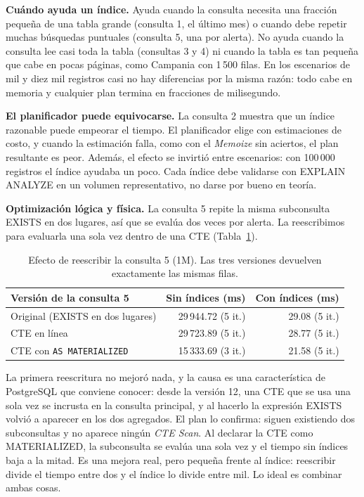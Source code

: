 \documentclass[11pt,letterpaper]{article}
\newcommand{\tbus}{\textunderscore\allowbreak}
\newcommand{\tb}[1]{{\ttfamily\let\_\tbus #1}}
\begin{document}
\textbf{Cuándo ayuda un índice.} Ayuda cuando la consulta necesita una fracción pequeña de una tabla grande (consulta 1, el último mes) o cuando debe repetir muchas búsquedas puntuales (consulta 5, una por alerta). No ayuda cuando la consulta lee casi toda la tabla (consultas 3 y 4) ni cuando la tabla es tan pequeña que cabe en pocas páginas, como \tb{Campania} con 1\,500 filas. En los escenarios de mil y diez mil registros casi no hay diferencias por la misma razón: todo cabe en memoria y cualquier plan termina en fracciones de milisegundo.

\textbf{El planificador puede equivocarse.} La consulta 2 muestra que un índice razonable puede empeorar el tiempo. El planificador elige con estimaciones de costo, y cuando la estimación falla, como con el \emph{Memoize} sin aciertos, el plan resultante es peor. Además, el efecto se invirtió entre escenarios: con 100\,000 registros el índice ayudaba un poco. Cada índice debe validarse con \tb{EXPLAIN ANALYZE} en un volumen representativo, no darse por bueno en teoría.

\textbf{Optimización lógica y física.} La consulta 5 repite la misma subconsulta \tb{EXISTS} en dos lugares, así que se evalúa dos veces por alerta. La reescribimos para evaluarla una sola vez dentro de una CTE (Tabla~\ref{tab:reescritura}).

\begin{table}[H]
\centering\small
\begin{tabular}{lrr}
\toprule
Versión de la consulta 5 & Sin índices (ms) & Con índices (ms) \\
\midrule
Original (EXISTS en dos lugares) & 29\,944.72 (5 it.) & 29.08 (5 it.) \\
CTE en línea & 29\,723.89 (5 it.) & 28.77 (5 it.) \\
CTE con \texttt{AS MATERIALIZED} & 15\,333.69 (3 it.) & 21.58 (5 it.) \\
\bottomrule
\end{tabular}
\caption{Efecto de reescribir la consulta 5 (1M). Las tres versiones devuelven exactamente las mismas filas.}\label{tab:reescritura}
\end{table}


La primera reescritura no mejoró nada, y la causa es una característica de PostgreSQL que conviene conocer: desde la versión 12, una CTE que se usa una sola vez se incrusta en la consulta principal, y al hacerlo la expresión \tb{EXISTS} volvió a aparecer en los dos agregados. El plan lo confirma: siguen existiendo dos subconsultas y no aparece ningún \emph{CTE Scan}. Al declarar la CTE como \tb{MATERIALIZED}, la subconsulta se evalúa una sola vez y el tiempo sin índices baja a la mitad. Es una mejora real, pero pequeña frente al índice: reescribir divide el tiempo entre dos y el índice lo divide entre mil. Lo ideal es combinar ambas cosas.
\end{document}
